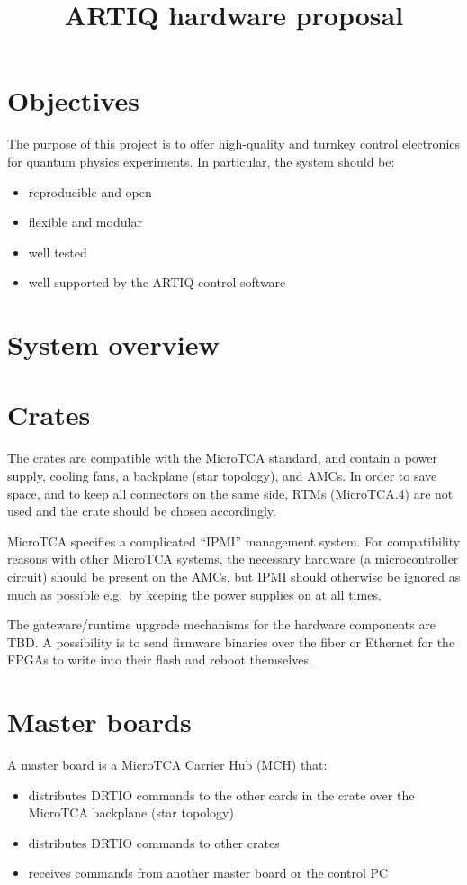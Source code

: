 \documentclass[11pt]{paper}
\begin{document}
\title{ARTIQ hardware proposal}

\maketitle

\section{Objectives}
The purpose of this project is to offer high-quality and turnkey control electronics for quantum physics experiments. In particular, the system should be:
\begin{itemize}
\setlength{\itemsep}{0pt}
\item reproducible and open
\item flexible and modular
\item well tested
\item well supported by the ARTIQ control software
\end{itemize}

\section{System overview}

\section{Crates}
The crates are compatible with the MicroTCA standard, and contain a power supply, cooling fans, a backplane (star topology), and AMCs. In order to save space, and to keep all connectors on the same side, RTMs (MicroTCA.4) are not used and the crate should be chosen accordingly.

MicroTCA specifies a complicated ``IPMI'' management system. For compatibility reasons with other MicroTCA systems, the necessary hardware (a microcontroller circuit) should be present on the AMCs, but IPMI should otherwise be ignored as much as possible e.g.\ by keeping the power supplies on at all times.

The gateware/runtime upgrade mechanisms for the hardware components are TBD. A possibility is to send firmware binaries over the fiber or Ethernet for the FPGAs to write into their flash and reboot themselves.

\section{Master boards}
A master board is a MicroTCA Carrier Hub (MCH) that:
\begin{itemize}
\setlength{\itemsep}{0pt}
\item distributes DRTIO commands to the other cards in the crate over the MicroTCA backplane (star topology)
\item distributes DRTIO commands to other crates
\item receives commands from another master board or the control PC
\end{itemize}
\end{document}
